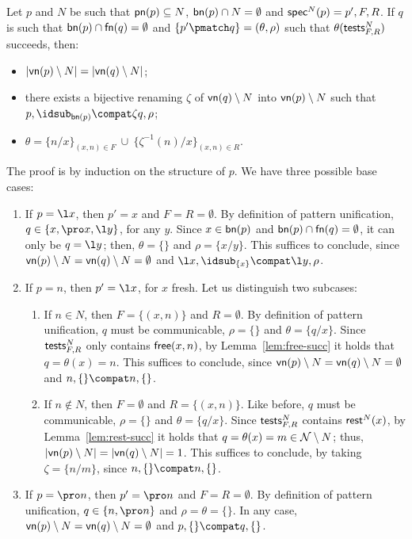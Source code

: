 \documentclass{LMCS}
\begin{document}
\begin{lem}
\label{lem:reply-rename}
Let $p$ and $N$ be such that ${\sf pn}(p) \subseteq N$, ${\sf bn}(p) \cap N = \emptyset$ and
${\sf spec}^{N}(p)=p',F,R$. If $q$ is such that ${\sf bn}(p) \cap {\sf fn}(q) = \emptyset$ and
$\{p'\pmatch q\}=(\theta,\rho)$ such that $\theta({\sf tests}^N_{F,R})$ succeeds, then:
\begin{itemize}
\item $|{\sf vn}(p) \setminus N| = |{\sf vn}(q) \setminus N|$; 
\item there exists a bijective renaming $\zeta$ of ${\sf vn}(q) \setminus N$ into ${\sf vn}(p) \setminus N$
such that $p,\idsub_{{\sf bn}(p)}\compat \zeta q,\rho$;
\item $\theta = \{n/x\}_{(x,n) \in F}\ \cup\ \{\zeta^{-1}(n)/x\}_{(x,n)\in R}$.
\end{itemize}
\end{lem}
\proof
The proof is by induction on the structure of $p$. We have three possible base cases:
\begin{enumerate}
	\item If $p=\l x$, then $p' = x$ and $F = R = \emptyset$. By definition of pattern unification,
		$q \in \{x,\pro x, \l y\}$, for any $y$. Since $x \in {\sf bn}(p)$ and ${\sf bn}(p) \cap {\sf fn}(q) = \emptyset$,
		it can only be $q = \l y$; then, $\theta = \{\}$ and $\rho = \{x/y\}$. This suffices to conclude,
		since ${\sf vn}(p) \setminus N = {\sf vn}(q) \setminus N = \emptyset$ and
		$\l x,\idsub_{\{x\}} \compat \l y,\rho$.
	\item If $p = n$, then $p' = \l x$, for $x$ fresh. Let us distinguish two subcases:
		\begin{enumerate}
		\item If $n \in N$, then $F = \{(x,n)\}$ and $R =
                  \emptyset$. By definition of pattern unification,
                  $q$ must be communicable, $\rho = \{\}$ and $\theta
                  = \{q/x\}$.  Since ${\sf tests}^N_{F,R}$ only
                  contains ${\sf free}(x,n)$, by
                  Lemma~\ref{lem:free-succ} it holds that $q =
                  \theta(x) = n$. This suffices to conclude, since
                  ${\sf vn}(p) \setminus N = {\sf vn}(q) \setminus N =
                  \emptyset$ and $n, \{\} \compat n,\{\}$.

		\item If $n \not\in N$, then $F = \emptyset$ and $R = \{(x,n)\}$. Like before,
		$q$ must be communicable, $\rho = \{\}$ and $\theta = \{q/x\}$. 
		Since ${\sf tests}^N_{F,R}$ contains ${\sf rest}^N(x)$,
		by Lemma~\ref{lem:rest-succ} it holds that $q = \theta(x) = m \in {\cal N} \setminus N$;
		thus, $|{\sf vn}(p) \setminus N| = |{\sf vn}(q) \setminus N| = 1$.
		This suffices to conclude, by taking $\zeta = \{n/m\}$, since $n, \{\} \compat n,\{\}$. 
		\end{enumerate}
	\item If $p = \pro n$, then $p' = \pro n$ and $F = R = \emptyset$. By definition of pattern unification,
		$q \in \{n,\pro n\}$ and $\rho = \theta = \{\}$. In any case, 
		${\sf vn}(p) \setminus N = {\sf vn}(q) \setminus N = \emptyset$ and
		$p,\{\} \compat q,\{\}$.
\end{enumerate}
\end{document}

